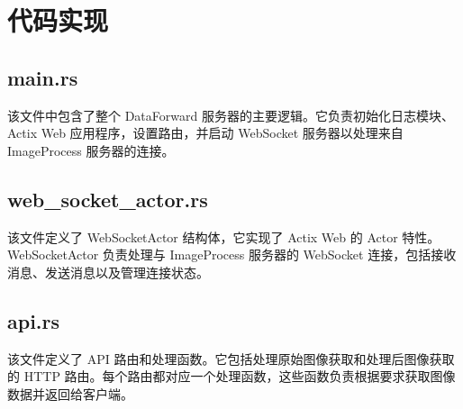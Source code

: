 \section{代码实现}

\subsection{main.rs}

该文件中包含了整个 DataForward 服务器的主要逻辑。它负责初始化日志模块、 Actix Web 应用程序，设置路由，并启动 WebSocket 服务器以处理来自 ImageProcess 服务器的连接。

\subsection{web\_socket\_actor.rs}

该文件定义了 WebSocketActor 结构体，它实现了 Actix Web 的 Actor 特性。WebSocketActor 负责处理与 ImageProcess 服务器的 WebSocket 连接，包括接收消息、发送消息以及管理连接状态。

\subsection{api.rs}

该文件定义了 API 路由和处理函数。它包括处理原始图像获取和处理后图像获取的 HTTP 路由。每个路由都对应一个处理函数，这些函数负责根据要求获取图像数据并返回给客户端。